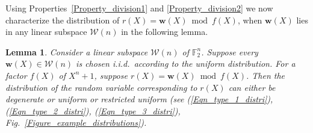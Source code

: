 \documentclass[10pt,journal]{IEEEtran}
\newtheorem{lemma}{Lemma}
\def \Fig {Fig.}
\begin{document}
Using Properties~\ref{Property_division1} and \ref{Property_division2}
we now characterize the distribution of 
$r(X) = \mathbf{w}(X) \bmod f(X)$, when $\mathbf{w}(X)$ lies in any linear subspace $\mathcal{W}(n)$ in the following lemma.


\begin{lemma}
\label{Lemma_three_type_distri}
%  
Consider a linear subspace $\mathcal{W}(n)$ of $\mathbb{F}_2^n$.
Suppose every $\mathbf{w}(X) \in \mathcal{W}(n)$ is chosen i.i.d.~according to the uniform distribution.
For a factor $f(X)$ of $X^n+1$, suppose $r(X) = \mathbf{w}(X) \bmod f(X)$.
Then the distribution of the random variable corresponding to $r(X)$ can either be degenerate or uniform
or restricted uniform (see (\ref{Eqn_type_1_distri}), (\ref{Eqn_type_2_distri}), (\ref{Eqn_type_3_distri}), \Fig~\ref{Figure_example_distributions}).
% 
\end{lemma}
% 
\end{document}
